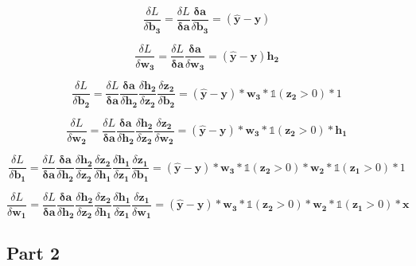 \documentclass[11pt]{article}
\begin{document}
\[\frac{\delta L}{\delta  \boldsymbol{b_3}} = \frac{\delta L}{\boldsymbol{\delta a}} \frac{\boldsymbol{\delta a}}{\delta  \boldsymbol{b_3}} = (\boldsymbol{\hat y}-\boldsymbol{y}) \]

\[\frac{\delta L}{\delta  \boldsymbol{w_3}} = \frac{\delta L}{\boldsymbol{\delta a}} \frac{\boldsymbol{\delta a}}{\delta  \boldsymbol{w_3}} = (\boldsymbol{\hat y}-\boldsymbol{y})\boldsymbol{h_2} \]

\[\frac{\delta L}{\delta  \boldsymbol{b_2}} = \frac{\delta L}{\boldsymbol{\delta a}} \frac{\boldsymbol{\delta a}}{\delta  \boldsymbol{h_2}} \frac{\delta  \boldsymbol{h_2}}{\delta  \boldsymbol{z_2}}\frac{\delta  \boldsymbol{z_2}}{\delta  \boldsymbol{b_2}} = (\boldsymbol{\hat y}-\boldsymbol{y})*\boldsymbol{w_3} * \mathbb{1}(\boldsymbol{z_2}>0)*1\]

\[\frac{\delta L}{\delta  \boldsymbol{w_2}} = \frac{\delta L}{\boldsymbol{\delta a}} \frac{\boldsymbol{\delta a}}{\delta  \boldsymbol{h_2}} \frac{\delta  \boldsymbol{h_2}}{\delta  \boldsymbol{z_2}}\frac{\delta  \boldsymbol{z_2}}{\delta  \boldsymbol{w_2}} = (\boldsymbol{\hat y}-\boldsymbol{y})*\boldsymbol{w_3} * \mathbb{1}(\boldsymbol{z_2}>0)*\boldsymbol{h_1}\]

\[\frac{\delta L}{\delta  \boldsymbol{b_1}} = \frac{\delta L}{\boldsymbol{\delta a}} \frac{\boldsymbol{\delta a}}{\delta  \boldsymbol{h_2}} \frac{\delta  \boldsymbol{h_2}}{\delta  \boldsymbol{z_2}}\frac{\delta  \boldsymbol{z_2}}{\delta  \boldsymbol{h_1}} \frac{\delta  \boldsymbol{h_1}}{\delta  \boldsymbol{z_1}} \frac{\delta  \boldsymbol{z_1}}{\delta  \boldsymbol{b_1}}= (\boldsymbol{\hat y}-\boldsymbol{y})*\boldsymbol{w_3} * \mathbb{1}(\boldsymbol{z_2}>0)*\boldsymbol{w_2}*\mathbb{1}(\boldsymbol{z_1}>0) *1\]

\[\frac{\delta L}{\delta  \boldsymbol{w_1}} = \frac{\delta L}{\boldsymbol{\delta a}} \frac{\boldsymbol{\delta a}}{\delta  \boldsymbol{h_2}} \frac{\delta  \boldsymbol{h_2}}{\delta  \boldsymbol{z_2}}\frac{\delta  \boldsymbol{z_2}}{\delta  \boldsymbol{h_1}} \frac{\delta  \boldsymbol{h_1}}{\delta  \boldsymbol{z_1}} \frac{\delta  \boldsymbol{z_1}}{\delta  \boldsymbol{w_1}}= (\boldsymbol{\hat y}-\boldsymbol{y})*\boldsymbol{w_3} * \mathbb{1}(\boldsymbol{z_2}>0)*\boldsymbol{w_2}*\mathbb{1}(\boldsymbol{z_1}>0) *\boldsymbol{x} \]

    \subsection{Part 2}\label{part-2}
\end{document}
